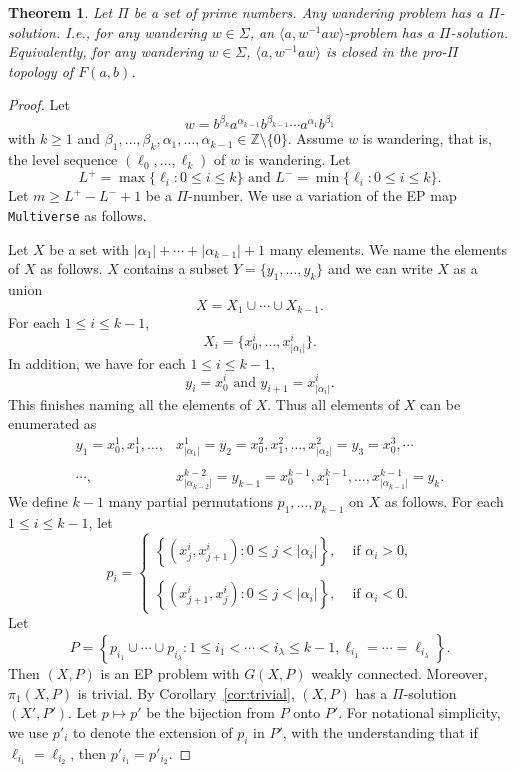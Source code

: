 \documentclass[10pt,a4paper]{amsart}
\newtheorem{theorem}{Theorem}[section]
\theoremstyle{definition}
\theoremstyle{definition}
\numberwithin{equation}{section}
\begin{document}
\begin{theorem}\label{thm:wandering} Let $\Pi$ be a set of prime numbers. Any wandering problem has a $\Pi$-solution. I.e., for any wandering $w\in \Sigma$, an $\langle a, w^{-1}aw\rangle$-problem has a $\Pi$-solution. Equivalently, for any wandering $w\in \Sigma$, $\langle a, w^{-1}aw\rangle$ is closed in the pro-$\Pi$ topology of $F(a,b)$.
\end{theorem}

\begin{proof} Let 
$$w=b^{\beta_k}a^{\alpha_{k-1}}b^{\beta_{k-1}}\cdots a^{\alpha_1}b^{\beta_1} $$
with $k\geq 1$ and $\beta_1,\dots, \beta_k, \alpha_1, \dots, \alpha_{k-1}\in \mathbb{Z}\setminus\{0\}$. Assume $w$ is wandering, that is, the level sequence $(\ell_0,\dots, \ell_k)$ of $w$ is wandering. Let 
$$ L^+=\max\{\ell_i\colon 0\leq i\leq k\} \mbox{ and } L^-=\min\{\ell_i\colon 0\leq i\leq k\}. $$
Let $m\geq L^+-L^-+1$ be a $\Pi$-number. We use a variation of the EP map {\tt Multiverse} as follows. 

Let $X$ be a set with $|\alpha_1|+\cdots+|\alpha_{k-1}|+1$ many elements. We name the elements of $X$ as follows. $X$ contains a subset $Y=\{y_1,\dots, y_k\}$ and we can write $X$ as a union
$$ X=X_1\cup \cdots \cup X_{k-1}. $$
For each $1\leq i\leq k-1$, 
$$X_i=\{x^i_0,\dots, x^i_{|\alpha_i|}\}. $$
In addition, we have for each $1\leq i\leq k-1$,
$$ y_i=x^i_0 \mbox{ and } y_{i+1}=x^i_{|\alpha_i|}. $$
This finishes naming all the elements of $X$. Thus all elements of $X$ can be enumerated as
$$\begin{array}{rl} y_1=x^1_0, x^1_1,\dots, &\!\!\!\!x^1_{|\alpha_1|}=y_2=x^2_0, x^2_1,\dots, x^2_{|\alpha_2|}=y_3=x^3_0,\cdots \\ \\
 \cdots, &\!\!\!\!x^{k-2}_{|\alpha_{k-2}|}=y_{k-1}=x^{k-1}_0, x^{k-1}_1,\dots,  x^{k-1}_{|\alpha_{k-1}|}=y_k. 
\end{array}$$
We define $k-1$ many partial permutations $p_1,\dots, p_{k-1}$ on $X$ as follows. For each $1\leq i\leq k-1$, let
$$ p_i=\left\{\begin{array}{ll}\left\{ (x^i_j, x^i_{j+1})\colon 0\leq j<|\alpha_i|\right\}, & \mbox{ if $\alpha_i>0$,} \\ \\
\left\{ (x^i_{j+1}, x^i_j)\colon 0\leq j<|\alpha_i|\right\}, & \mbox{ if $\alpha_i<0$.} 
\end{array}\right.
$$
Let 
$$P=\left\{p_{i_1}\cup \cdots \cup p_{i_\lambda}\colon 1\leq i_1<\cdots<i_\lambda\leq k-1, \ell_{i_1}=\cdots=\ell_{i_\lambda}\right\}. $$
 Then $(X, P)$ is an EP problem with $G(X, P)$ weakly connected. Moreover, $\pi_1(X, P)$ is trivial. By Corollary~\ref{cor:trivial}, $(X,P)$ has a $\Pi$-solution $(X', P')$. Let $p\mapsto p'$ be the bijection from $P$ onto $P'$. For notational simplicity, we use $p'_i$ to denote the extension of $p_i$ in $P'$, with the understanding that if $\ell_{i_1}=\ell_{i_2}$, then $p'_{i_1}=p'_{i_2}$.


\end{proof}
\end{document}
